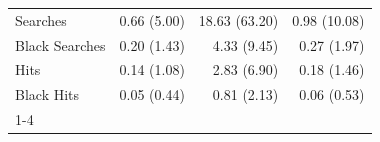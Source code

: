 \begin{table}[!h]
\begin{tabular}{llll}
\multicolumn{1}{l}{\hspace{1em}Searches} &
  \multicolumn{1}{r}{0.66 (5.00)} &
  \multicolumn{1}{r}{18.63 (63.20)} &
  \multicolumn{1}{r}{0.98 (10.08)} \\
\multicolumn{1}{l}{\hspace{1em}Black Searches} &
  \multicolumn{1}{r}{0.20 (1.43)} &
  \multicolumn{1}{r}{4.33 (9.45)} &
  \multicolumn{1}{r}{0.27 (1.97)} \\
\multicolumn{1}{l}{\hspace{1em}Hits} &
  \multicolumn{1}{r}{0.14 (1.08)} &
  \multicolumn{1}{r}{2.83 (6.90)} &
  \multicolumn{1}{r}{0.18 (1.46)} \\
\multicolumn{1}{l}{\hspace{1em}Black Hits} &
  \multicolumn{1}{r}{0.05 (0.44)} &
  \multicolumn{1}{r}{0.81 (2.13)} &
  \multicolumn{1}{r}{0.06 (0.53)} \\
\cline{1-4}
\end{tabular}
\end{table}
